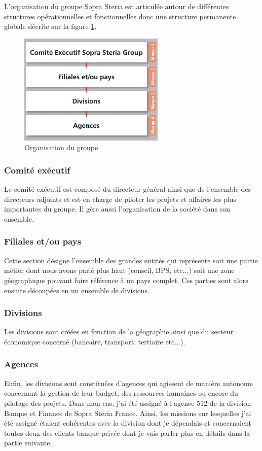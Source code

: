 	L'organisation du groupe Sopra Steria est articulée autour de différentes structures opérationnelles et fonctionnelles donc une structure permanente globale décrite sur la figure \ref{sopraSteriaOrganisation}.

\begin{figure}[h]
	\includegraphics[scale=0.8]{images/entreprise/sopraSteriaOrganisation.png}
	\centering
	\caption{Organisation du groupe}
	\label{sopraSteriaOrganisation}
\end{figure}
		
\subsubsection{Comité exécutif}

	Le comité exécutif est composé du directeur général ainsi que de l'ensemble des directeurs adjoints et est en charge de piloter les projets et affaires les plus importantes du groupe. Il gère aussi l'organisation de la société dans son ensemble.

\subsubsection{Filiales et/ou pays}

	Cette section désigne l'ensemble des grandes entités qui représente soit une partie métier dont nous avons parlé plus haut (conseil, BPS, etc...) soit une zone géographique pouvant faire référence à un pays complet. Ces parties sont alors ensuite découpées en un ensemble de divisions.

\subsubsection{Divisions}

	Les divisions sont créées en fonction de la géographie ainsi que du secteur économique concerné (bancaire, transport, tertiaire etc...).

\subsubsection{Agences}

	Enfin, les divisions sont constituées d'agences qui agissent de manière autonome concernant la gestion de leur budget, des ressources humaines ou encore du pilotage des projets. Dans mon cas, j'ai été assigné à l'agence 512 de la division Banque et Finance de Sopra Steria France. Ainsi, les missions sur lesquelles j'ai été assigné étaient cohérentes avec la division dont je dépendais et concernaient toutes deux des clients banque privée dont je vais parler plus en détails dans la partie suivante.